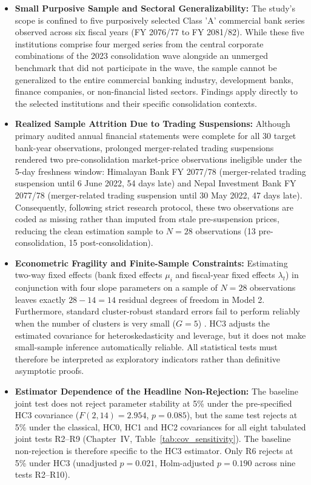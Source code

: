 \begin{itemize}
\item \textbf{Small Purposive Sample and Sectoral Generalizability:}
The study's scope is confined to five purposively selected Class 'A' commercial bank series observed across six fiscal years (FY 2076/77 to FY 2081/82). While these five institutions comprise four merged series from the central corporate combinations of the 2023 consolidation wave alongside an unmerged benchmark that did not participate in the wave, the sample cannot be generalized to the entire commercial banking industry, development banks, finance companies, or non-financial listed sectors. Findings apply directly to the selected institutions and their specific consolidation contexts.

\item \textbf{Realized Sample Attrition Due to Trading Suspensions:}
Although primary audited annual financial statements were complete for all 30 target bank-year observations, prolonged merger-related trading suspensions rendered two pre-consolidation market-price observations ineligible under the 5-day freshness window: Himalayan Bank FY 2077/78 (merger-related trading suspension until 6 June 2022, 54 days late) and Nepal Investment Bank FY 2077/78 (merger-related trading suspension until 30 May 2022, 47 days late). Consequently, following strict research protocol, these two observations are coded as missing rather than imputed from stale pre-suspension prices, reducing the clean estimation sample to $N = 28$ observations (13 pre-consolidation, 15 post-consolidation).

\item \textbf{Econometric Fragility and Finite-Sample Constraints:}
Estimating two-way fixed effects (bank fixed effects $\mu_i$ and fiscal-year fixed effects $\lambda_t$) in conjunction with four slope parameters on a sample of $N = 28$ observations leaves exactly $28 - 14 = 14$ residual degrees of freedom in Model 2. Furthermore, standard cluster-robust standard errors fail to perform reliably when the number of clusters is very small ($G = 5$) \citep{cameron2008clusters}. HC3 adjusts the estimated covariance for heteroskedasticity and leverage, but it does not make small-sample inference automatically reliable. All statistical tests must therefore be interpreted as exploratory indicators rather than definitive asymptotic proofs.

\item \textbf{Estimator Dependence of the Headline Non-Rejection:}
The baseline joint test does not reject parameter stability at 5\% under the pre-specified HC3 covariance ($F(2,14)=2.954$, $p=0.085$), but the same test rejects at 5\% under the classical, HC0, HC1 and HC2 covariances for all eight tabulated joint tests R2--R9 (Chapter~IV, Table~\ref{tab:cov_sensitivity}). The baseline non-rejection is therefore specific to the HC3 estimator. Only R6 rejects at 5\% under HC3 (unadjusted $p=0.021$, Holm-adjusted $p=0.190$ across nine tests R2--R10).


\end{itemize}
